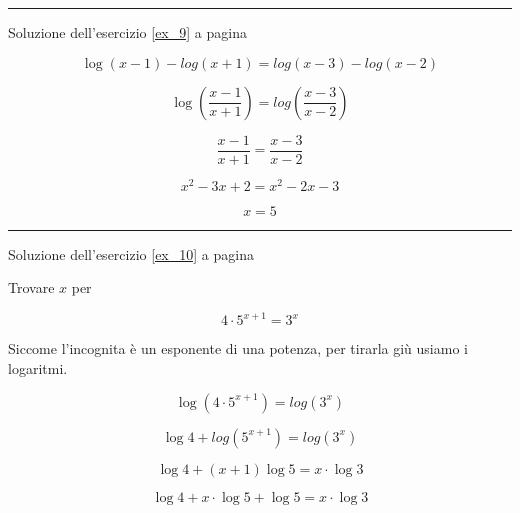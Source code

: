 \vspace{1cm}
\hrule
\vspace{1cm}

Soluzione dell'esercizio \ref{ex_9} a pagina \pageref{ex_9}\label{sol_9}

\begin{equation*}
\log(x-1)-log(x+1)=log(x-3)-log(x-2)
\end{equation*}

\begin{equation*}
\log\left(\frac{x-1}{x+1}\right)=log\left(\frac{x-3}{x-2}\right)
\end{equation*}

\begin{equation*}
\frac{x-1}{x+1}=\frac{x-3}{x-2}
\end{equation*}


\begin{equation*}
x^2-3x+2=x^2-2x-3
\end{equation*}

\begin{equation*}
x=5
\end{equation*}



\vspace{1cm}
\hrule
\vspace{1cm}

Soluzione dell'esercizio \ref{ex_10} a pagina \pageref{ex_10}\label{sol_10}


Trovare $x$ per 


\begin{equation*}
4\cdot 5^{x+1} = 3^x
\end{equation*}

Siccome l'incognita è un esponente di una potenza, per tirarla giù usiamo i logaritmi.

\begin{equation*}
\log(4\cdot 5^{x+1}) = log(3^x)
\end{equation*}

\begin{equation*}
\log 4+log(5^{x+1}) = log(3^x)
\end{equation*}

\begin{equation*}
\log 4 +(x+1)\log5 = x\cdot \log3
\end{equation*}

\begin{equation*}
\log4 +x\cdot \log5+\log5 = x\cdot \log3
\end{equation*}

